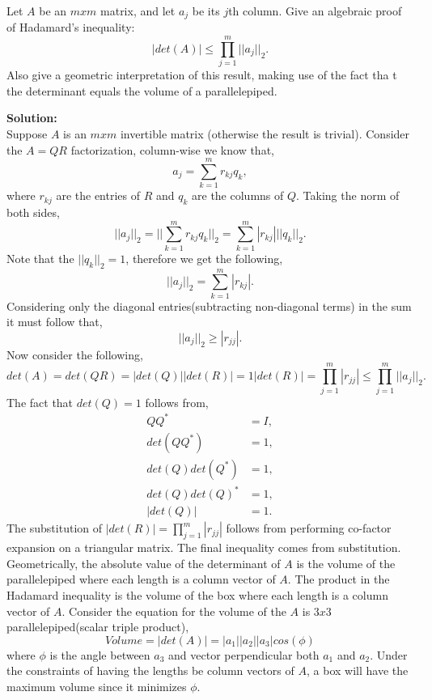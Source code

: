 \documentclass[12pt]{article}
\makeatletter
\theoremstyle{homework}
\newenvironment{exercise}[1]
{\def\@currentlabel{#1}\exercisecore}
{\endexercisecore}
\newcommand{\localhead}[1]{\par\smallskip\noindent\textbf{#1}\nobreak\\}%
\newcommand\solution{\localhead{Solution:}}
\makeatother
\begin{document}
\begin{exercise}{7.3} Let $A$ be an $mxm$ matrix, and let $a_j$ be its $j$th column. Give an algebraic proof of Hadamard's inequality: 
  \begin{equation*}
    |det(A)|\leq \prod_{j = 1}^m ||a_j||_2.
  \end{equation*}
  Also give a geometric interpretation of this result, making use of the fact tha t the determinant equals the volume of a parallelepiped.\\
  \solution Suppose $A$ is an $mxm$ invertible matrix (otherwise the result is trivial). Consider the $A = QR$ factorization, column-wise we know that, 
  \begin{equation*}
    a_j = \sum_{k = 1}^m r_{kj}q_k,
  \end{equation*}
  where $r_{kj}$ are the entries of $R$ and $q_k$ are the columns of $Q$. Taking the norm of both sides, 
  \begin{equation*}
    ||a_j||_2 = ||\sum_{k = 1}^m r_{kj}q_k||_2 = \sum_{k = 1}^m |r_{kj}|||q_k||_2. 
  \end{equation*}
  Note that the $||q_k||_2 = 1$, therefore we get the following, 
  \begin{equation*}
    ||a_j||_2 = \sum_{k = 1}^m |r_{kj}|.
  \end{equation*}
  Considering only the diagonal entries(subtracting non-diagonal terms) in the sum it must follow that,
  \begin{equation*}
    ||a_j||_2 \geq |r_{jj}|.
  \end{equation*}
  Now consider the following, 
  \begin{equation*}
    det(A) = det(QR) = |det(Q)||det(R)| = 1|det(R)| = \prod_{j = 1}^m|r_{jj}| \leq \prod_{j = 1}^m ||a_j||_2.
  \end{equation*}
  The fact that $det(Q) = 1$ follows from, 
  \begin{align*}
    QQ^* &= I,\\
    det(QQ^*) &= 1,\\
    det(Q)det(Q^*) &= 1,\\
    det(Q)det(Q)^* &= 1,\\
    |det(Q)| &= 1.
  \end{align*}
  The substitution of $|det(R)| = \prod_{j = 1}^m|r_{jj}|$ follows from performing co-factor expansion on a triangular matrix. The final 
  inequality comes from substitution. \\
  Geometrically, the absolute value of the determinant of $A$ is the volume of the parallelepiped where each length is a column vector of $A$. The 
  product in the Hadamard inequality is the volume of the box where each length is a column vector of $A$.
  Consider the equation for the volume of the $A$ is $3x3$ parallelepiped(scalar triple product),
  \begin{equation*}
    Volume = |det(A)| = |a_1||a_2||a_3|cos(\phi)
  \end{equation*} 
  where $\phi$ is the angle between $a_3$ and vector perpendicular both $a_1$ and $a_2$. Under the constraints of having the lengths 
  be column vectors of $A$, a box will have the maximum volume since it minimizes $\phi$. 
\end{exercise}
\end{document}
